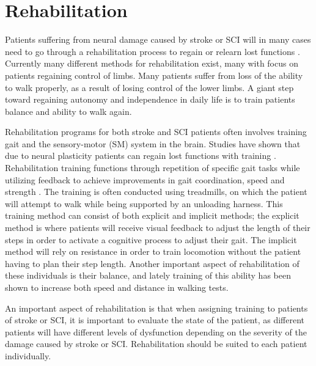 \section{Rehabilitation}

Patients suffering from neural damage caused by stroke or SCI will in many cases need to go through a rehabilitation process to regain or relearn lost functions \cite{Sandrini2018,Michael2005}. Currently many different methods for rehabilitation exist, many with focus on patients regaining control of limbs. Many patients suffer from loss of the ability to walk properly, as a result of losing control of the lower limbs. A giant step toward regaining autonomy and independence in daily life is to train patients balance and ability to walk again.

Rehabilitation programs for both stroke and SCI patients often involves training gait and the sensory-motor (SM) system in the brain. Studies have shown that due to neural plasticity patients can regain lost functions with training \cite{Belda2011, Sandrini2018}. %
Rehabilitation training functions through repetition of specific gait tasks while utilizing feedback to achieve improvements in gait coordination, speed and strength \cite{Belda2011}. The training is often conducted using treadmills, on which the patient will attempt to walk while being supported by an unloading harness. This training method can consist of both explicit and implicit methods; the explicit method is where patients will receive visual feedback to adjust the length of their steps in order to activate a cognitive process to adjust their gait. The implicit method will rely on resistance in order to train locomotion without the patient having to plan their step length. Another important aspect of rehabilitation of these individuals is their balance, and lately training of this ability has been shown to increase both speed and distance in walking tests. \cite{Sandrini2018}

An important aspect of rehabilitation is that when assigning training to patients of stroke or SCI, it is important to evaluate the state of the patient, as different patients will have different levels of dysfunction depending on the severity of the damage caused by stroke or SCI. Rehabilitation should be suited to each patient individually. \cite{Sandrini2018}


